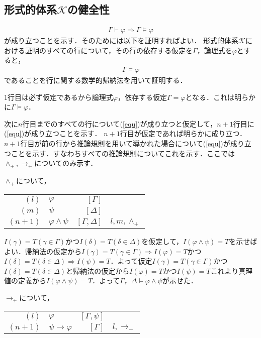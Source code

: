 \documentclass[10pt,b5paper,papersize,dvipdfmx]{jsbook}
\begin{document}
\subsection{形式的体系\texorpdfstring{$\mathcal K$}{K}の健全性}
\begin{align}
  \Gamma \vdash \varphi \Rightarrow \Gamma \models \varphi
\end{align}
が成り立つことを示す．そのためには以下を証明すればよい．
形式的体系$\mathcal K$における証明のすべての行について，その行の依存する仮定を$\Gamma$，論理式を$\varphi$とすると，
\begin{align}
  \label{equ} \Gamma \models \varphi
\end{align}
であることを行に関する数学的帰納法を用いて証明する．\par
1行目は必ず仮定であるから論理式$\varphi$，依存する仮定$\Gamma = \varphi$となる．これは明らかに$\Gamma \models \varphi$． \par
次に$n$行目までのすべての行について(\ref{equ})が成り立つと仮定して，$n+1$行目に(\ref{equ})が成り立つことを示す．
$n+1$行目が仮定であれば明らかに成り立つ．$n+1$行目が前の行から推論規則を用いて導かれた場合について(\ref{equ})が成り立つことを示す．すなわちすべての推論規則についてこれを示す．ここでは$\land_+, \to_+$についてのみ示す．\par
$\land_+$について，
\begin{table}[H]
  \begin{tabular}{rlrl}
    $(l)$&$\varphi$&$[\Gamma]$& \\
    $(m)$&$\psi$&$[\Delta]$& \\
    $(n+1)$&$\varphi \land \psi$&$[\Gamma,\Delta]$&$l,m,\land_+$
  \end{tabular}
\end{table}
$I(\gamma)=T(\gamma \in \Gamma)$かつ$I(\delta)=T(\delta \in \Delta)$を仮定して，$I(\varphi \land \psi)=T$を示せばよい．帰納法の仮定から$I(\gamma)=T(\gamma \in \Gamma)\Rightarrow I(\varphi)=T$かつ$I(\delta)=T(\delta \in \Delta)\Rightarrow I(\psi)=T$．よって仮定$I(\gamma)=T(\gamma \in \Gamma)$かつ$I(\delta)=T(\delta \in \Delta)$と帰納法の仮定から$I(\varphi)=T$かつ$I(\psi)=T$これより真理値の定義から$I(\varphi \land \psi)=T$．よって$\Gamma，\Delta \models \varphi \land \psi$が示せた．\par
$\to_+$について，
\begin{table}[H]
  \begin{tabular}{rlrl}
    $(l)$&$\varphi$&$[\Gamma,\psi]$& \\
    $(n+1)$&$\psi \to \varphi$&$[\Gamma]$&$l,\to_+$ \\
  \end{tabular}
\end{table}
\end{document}
